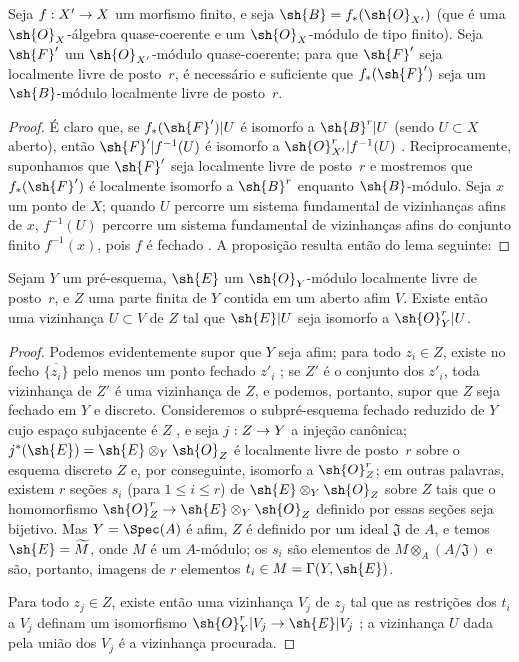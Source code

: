 \documentclass[oneside,10pt]{amsart}
\makeatletter
\renewcommand{\leq}{\leqslant}
\newcommand{\ega@arrow}[2]{\mathchoice{#1}{#2}{#2}{#2}}
\renewcommand{\to}{\ega@arrow{\longrightarrow}{\rightarrow}}
\newcommand{\oldpage}[2][]{\marginnote{\normalfont\footnotesize\textbf{#1}~|~#2}\ignorespaces}
\let\EGAOriginalLabel\label
\renewcommand{\label}[1]{\phantomsection\EGAOriginalLabel{#1}}
\makeatother
\begin{document}
\begin{proposition}[6.1.12]
\label{II.6.1.12}
Seja $f:X'\to X$ um morfismo finito, e seja $\sh{B}=f_*(\sh{O}_{X'})$ (que é uma $\sh{O}_X$-álgebra quase-coerente e um $\sh{O}_X$-módulo de tipo finito).
Seja $\sh{F}'$ um $\sh{O}_{X'}$-módulo quase-coerente;
para que $\sh{F}'$ seja localmente livre de posto~$r$, é necessário e suficiente que $f_*(\sh{F}')$ seja um $\sh{B}$-módulo localmente livre de posto~$r$.
\end{proposition}

\begin{proof}
É claro que, se $f_*(\sh{F}')|U$ é isomorfo a $\sh{B}^r|U$ (sendo $U\subset X$ aberto), então $\sh{F}'|f^{-1}(U)$ é isomorfo a $\sh{O}_{X'}^r|f^{-1}(U)$ .
Reciprocamente, suponhamos que $\sh{F}'$ seja localmente livre de posto~$r$ e mostremos que $f_*(\sh{F}')$ é localmente isomorfo a $\sh{B}^r$ enquanto $\sh{B}$-módulo.
Seja $x$ um ponto de $X$;
quando $U$ percorre um sistema fundamental de vizinhanças afins de $x$, $f^{-1}(U)$ percorre um sistema fundamental de vizinhanças afins  do conjunto finito $f^{-1}(x)$, pois $f$ é fechado .
A proposição resulta então do lema seguinte:
\end{proof}

\begin{lemma}[6.1.12.1]
\label{II.6.1.12.1}
Sejam $Y$ um pré-esquema, $\sh{E}$ um $\sh{O}_Y$-módulo localmente livre de posto~$r$, e $Z$ uma parte finita de $Y$ contida em um aberto afim $V$.
Existe então uma vizinhança $U\subset V$ de $Z$ tal que $\sh{E}|U$ seja isomorfo a $\sh{O}_Y^r|U$.
\end{lemma}

\begin{proof}
Podemos evidentemente supor que $Y$ seja afim;
para todo $z_i\in Z$, existe no fecho $\overline{\{z_i\}}$ pelo menos um ponto fechado $z'_i$ ;
se $Z'$ é o conjunto dos $z'_i$, toda vizinhança de $Z'$ é uma vizinhança de $Z$, e podemos, portanto, supor que $Z$ seja fechado em $Y$ e discreto.
Consideremos o subpré-esquema fechado reduzido de $Y$ cujo espaço subjacente é $Z$ , e seja $j:Z\to Y$ a injeção canônica;
$j^*(\sh{E})=\sh{E}\otimes_Y\sh{O}_Z$ é localmente livre de posto~$r$ sobre o esquema discreto $Z$ e, por conseguinte, isomorfo a $\sh{O}_Z^r$;
em outras palavras, existem $r$ seções $s_i$ (para $1\leq i\leq r$) de $\sh{E}\otimes_Y\sh{O}_Z$ sobre $Z$ tais que o homomorfismo $\sh{O}_Z^r\to\sh{E}\otimes_Y\sh{O}_Z$ definido por essas seções seja bijetivo.
Mas $Y=\Spec(A)$ é afim, $Z$ é definido por um ideal $\mathfrak{J}$ de $A$, e temos $\sh{E}=\widetilde{M}$, onde $M$ é um $A$-módulo;
os $s_i$ são elementos de $M\otimes_A(A/\mathfrak{J})$ e são, portanto, imagens de $r$ elementos $t_i\in M=\Gamma(Y,\sh{E})$.

\oldpage[II]{114}
Para todo $z_j\in Z$, existe então uma vizinhança $V_j$ de $z_j$ tal que as restrições dos $t_i$ a $V_j$ definam um isomorfismo $\sh{O}_Y^r|V_j\to\sh{E}|V_j$ ;
a vizinhança $U$ dada pela união dos $V_j$ é a vizinhança procurada.
\end{proof}
\end{document}

